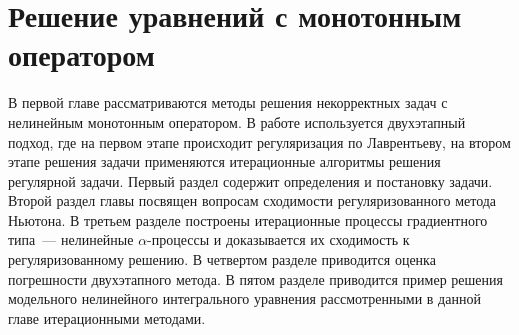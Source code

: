 \chapter{Решение уравнений с монотонным оператором}
В первой главе рассматриваются методы решения некорректных задач с нелинейным монотонным оператором. В работе используется двухэтапный подход, где на первом этапе происходит регуляризация по Лаврентьеву, на втором этапе решения задачи применяются итерационные алгоритмы решения регулярной задачи. Первый раздел содержит определения и постановку задачи. Второй раздел главы посвящен вопросам сходимости регуляризованного метода Ньютона. В третьем разделе построены итерационные процессы градиентного типа~--- нелинейные $\alpha$-процессы и доказывается их сходимость к регуляризованному решению. В четвертом разделе приводится оценка погрешности двухэтапного метода. В пятом разделе приводится пример решения модельного нелинейного интегрального уравнения рассмотренными в данной главе итерационными методами.

\newpage
